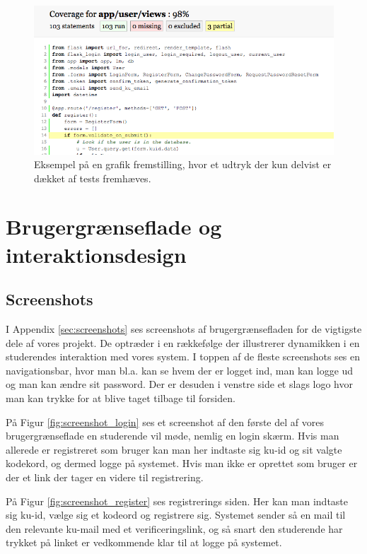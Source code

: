 \documentclass[11pt, a4paper]{article}
\begin{document}
\begin{figure}[h]
    \centering
    \includegraphics[width=0.8\linewidth]{figures/code_coverage.png}
    \caption{Eksempel på en grafik fremstilling, hvor et udtryk der kun delvist er dækket af tests fremhæves.}
    \label{fig:code_coverage}
\end{figure}

\section{Brugergrænseflade og interaktionsdesign}
\label{sec:brugergraenseflade}
\subsection{Screenshots}
I Appendix \ref{sec:screenshots} ses screenshots af brugergrænsefladen for de vigtigste dele af vores projekt. De optræder i en rækkefølge der illustrerer dynamikken i en studerendes interaktion med vores system. I toppen af de fleste screenshots ses en navigationsbar, hvor man bl.a. kan se hvem der er logget ind, man kan logge ud og man kan ændre sit password. Der er desuden i venstre side et slags logo hvor man kan trykke for at blive taget tilbage til forsiden.

På Figur \ref{fig:screenshot_login} ses et screenshot af den første del af vores brugergrænseflade en studerende vil møde, nemlig en login skærm. Hvis man allerede er registreret som bruger kan man her indtaste sig ku-id og sit valgte kodekord, og dermed logge på systemet. Hvis man ikke er oprettet som bruger er der et link der tager en videre til registrering. 

På Figur \ref{fig:screenshot_register} ses registrerings siden. Her kan man indtaste sig ku-id, vælge sig et kodeord og registrere sig. Systemet sender så en mail til den relevante ku-mail med et verificeringslink, og så snart den studerende har trykket på linket er vedkommende klar til at logge på systemet.
\end{document}
